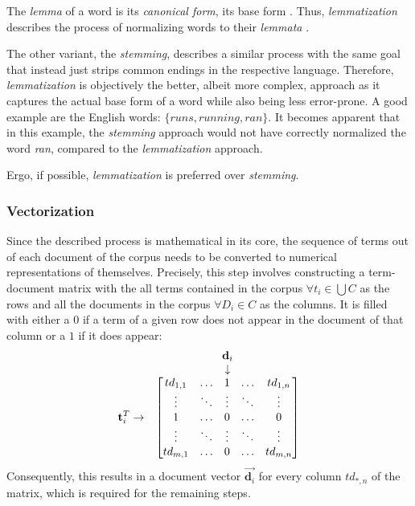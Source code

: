 \documentclass[12pt,a4paper]{report}
\begin{document}
The \textit{lemma} of a word is its \textit{canonical form}, its base form \cite{plisson2004lemma}.
Thus, \textit{lemmatization} describes the process of normalizing words to their
\textit{lemmata} \cite{plisson2004lemma}.

The other variant, the \textit{stemming}, describes a similar process with the
same goal that instead just strips common endings in the respective language.
Therefore, \textit{lemmatization} is objectively the better, albeit more complex,
approach as it captures the actual base form of a word while also
being less error-prone. A good example are the English words:
\(\{\textit{runs}, \textit{running}, \textit{ran}\}\). It becomes apparent that
in this example, the \textit{stemming} approach would not have correctly
normalized the word \textit{ran}, compared to the \textit{lemmatization} approach.

Ergo, if possible, \textit{lemmatization} is preferred over \textit{stemming}.


\subsubsection{Vectorization}
Since the described process is mathematical in its core, the sequence of terms
out of each document of the corpus needs to be converted to
numerical representations of themselves.
Precisely, this step involves constructing a term-document matrix
with the all terms contained in the corpus \(\forall t_i \in \bigcup C\)
as the rows and all the documents in the corpus \(\forall D_i \in C\)
as the columns. It is filled with either a \(0\) if a term of a given row
does not appear in the document of that column or a \(1\) if it does appear:
\[
  \begin{matrix}
    & \textbf d_i \\
    & \downarrow \\
    \textbf t_i^{T} \rightarrow &
    \begin{bmatrix}
      td_{1,1}  & \dots   & 1       & \dots   & td_{1,n}  \\
      \vdots    & \ddots  & \vdots  & \ddots  & \vdots    \\
      1         & \dots   & 0       & \dots   & 0         \\
      \vdots    & \ddots  & \vdots  & \ddots  & \vdots    \\
      td_{m,1}  & \dots   & 0       & \dots   & td_{m,n}  \\
    \end{bmatrix}
  \end{matrix}
\]
Consequently, this results in a document vector
\(\vec{\mathbf d_i}\) for every column \(td_{*,n}\) of the matrix,
which is required for the remaining steps.
\end{document}
